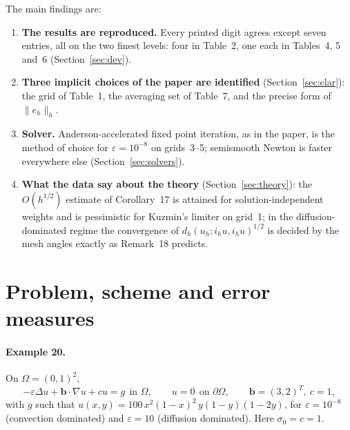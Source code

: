 \documentclass[11pt]{article}
\newcommand{\eps}{\varepsilon}
\newcommand{\bb}{\boldsymbol{b}}
\begin{document}


The main findings are:
\begin{enumerate}[leftmargin=*]
\item \textbf{The results are reproduced.} Every printed digit agrees except seven entries, all on the two finest
  levels: four in Table~2, one each in Tables~4, 5 and~6 (Section~\ref{sec:dev}).
\item \textbf{Three implicit choices of the paper are identified} (Section~\ref{sec:clar}): the grid of Table~1,
  the averaging set of Table~7, and the precise form of $\|e_h\|_h$.
\item \textbf{Solver.} Anderson-accelerated fixed point iteration, as in the paper, is the method of choice for
  $\eps=10^{-8}$ on grids~3--5; semismooth Newton is faster everywhere else (Section~\ref{sec:solvers}).
\item \textbf{What the data say about the theory} (Section~\ref{sec:theory}): the $O(h^{1/2})$ estimate of
  Corollary~17 is attained for solution-independent weights and is pessimistic for Kuzmin's limiter on grid~1;
  in the diffusion-dominated regime the convergence of $d_h(u_h;i_hu,i_hu)^{1/2}$ is decided by the mesh angles
  exactly as Remark~18 predicts.
\end{enumerate}

\section{Problem, scheme and error measures}\label{sec:setup}

\paragraph{Example 20.} On $\Omega=(0,1)^2$,
\begin{equation}\label{eq:pde}
  -\eps\Delta u+\bb\cdot\nabla u+cu=g\ \ \text{in }\Omega,\qquad u=0\ \ \text{on }\partial\Omega,\qquad
  \bb=(3,2)^T,\ c=1,
\end{equation}
with $g$ such that $u(x,y)=100\,x^2(1-x)^2\,y(1-y)(1-2y)$, for $\eps=10^{-8}$ (convection dominated) and $\eps=10$
(diffusion dominated). Here $\sigma_0=c=1$.
\end{document}

